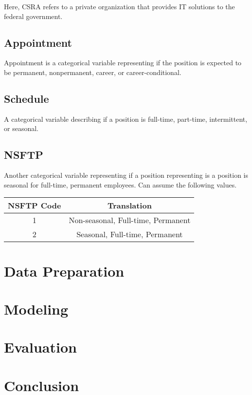 \documentclass{article}
\begin{document}
    Here, CSRA refers to a private organization that provides IT solutions to the federal government.

    \subsection{Appointment}
    Appointment is a categorical variable representing if the position is expected to be permanent, nonpermanent, career, or career-conditional.

    \subsection{Schedule}
    A categorical variable describing if a position is full-time, part-time, intermittent, or seasonal.

    \subsection{NSFTP}
    Another categorical variable representing if a position representing is a position is seasonal for full-time, permanent employees. Can assume the following values.

        \begin{center}
            \begin{tabular}{ |c|c| }
                \hline
                NSFTP Code & Translation \\
                \hline
                1 & Non-seasonal, Full-time, Permanent \\
                2 & Seasonal, Full-time, Permanent \\
                \hline
            \end{tabular}
        \end{center}

\section{Data Preparation}

\section{Modeling}

\section{Evaluation}

\section{Conclusion}
\end{document}
